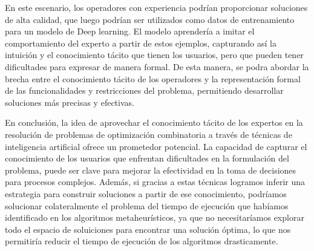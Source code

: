 En este escenario, los operadores con experiencia podrían proporcionar soluciones de alta calidad, que luego 
podrían ser utilizados como datos de entrenamiento para un modelo de Deep learning. El modelo aprendería 
a imitar el comportamiento del experto a partir de estos ejemplos, capturando así la intuición y el conocimiento 
tácito que tienen los usuarios, pero que pueden tener dificultades para expresar de manera formal. De esta manera, 
se podra abordar la brecha entre el conocimiento tácito de los operadores y la representación formal de las 
funcionalidades y restricciones del problema, permitiendo desarrollar soluciones más precisas y efectivas.\medskip

En conclusión, la idea de aprovechar el conocimiento tácito de los expertos en la resolución de problemas de 
optimización combinatoria a través de técnicas de inteligencia artificial ofrece un prometedor potencial. La 
capacidad de capturar el conocimiento de los usuarios que enfrentan dificultades en la formulación
del problema, puede ser clave para mejorar la efectividad en la toma de decisiones para procesos complejos. Además,
si gracias a estas técnicas logramos inferir una estrategia para construir soluciones a partir de ese conocimiento,
podríamos solucionar colateralmente el problema del tiempo de ejecución que habíamos identificado en los algoritmos 
metaheurísticos, ya que no necesitaríamos explorar todo el espacio de soluiciones para encontrar una solución óptima,
lo que nos permitiría reducir el tiempo de ejecución de los algoritmos drasticamente.



\pagebreak
